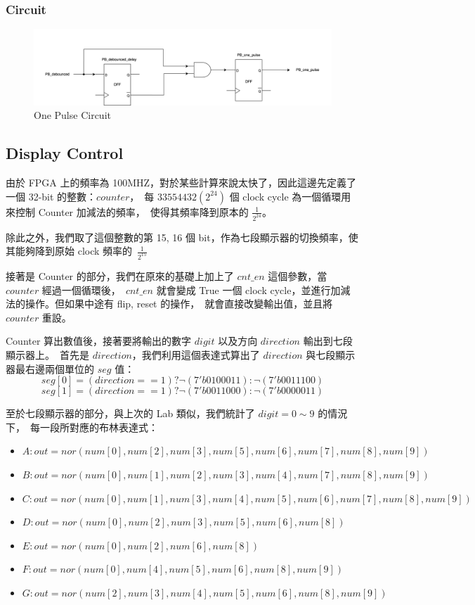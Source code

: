 \documentclass[10.5pt,compsoc,UTF8]{CjC}
\theoremstyle{mystyle}
\begin{document}
\subsubsection*{Circuit}
\begin{figure}[!h]
  \centering
  \includegraphics[width=\textwidth]{./img/Q5-One-pulse.png}
  \caption{One Pulse Circuit}
  \label{fig:one-pulse}
\end{figure}

\newpage

\subsection{Display Control}
由於 FPGA 上的頻率為 100MHZ，對於某些計算來說太快了，因此這邊先定義了一個 32-bit 的整數：$counter$，\
每 $33554432 (2^{24})$ 個 clock cycle 為一個循環用來控制 Counter 加減法的頻率，\
使得其頻率降到原本的 $\frac{1}{2^{24}}$。
\par
除此之外，我們取了這個整數的第 15, 16 個 bit，作為七段顯示器的切換頻率，使其能夠降到原始 clock 頻率的\
$\frac{1}{2^{15}}$
\par
接著是 Counter 的部分，我們在原來的基礎上加上了 $cnt\_en$ 這個參數，當 $counter$ 經過一個循環後，\
$cnt\_en$ 就會變成 True 一個 clock cycle，並進行加減法的操作。但如果中途有 flip, reset 的操作，\
就會直接改變輸出值，並且將 $counter$ 重設。
\par
Counter 算出數值後，接著要將輸出的數字 $digit$ 以及方向 $direction$ 輸出到七段顯示器上。\
首先是 $direction$，我們利用這個表達式算出了 $direction$ 與七段顯示器最右邊兩個單位的 $seg$ 值：
$$seg[0] = (direction == 1) ? \lnot(7'b0100011) : \lnot(7'b0011100)$$
$$seg[1] = (direction == 1) ? \lnot(7'b0011000) : \lnot(7'b0000011)$$

至於七段顯示器的部分，與上次的 Lab 類似，我們統計了 $digit = 0 \sim 9$ 的情況下，\
每一段所對應的布林表達式：
\begin{itemize}
  \item $A: out = nor(num[0], num[2], num[3],
  num[5], num[6], num[7], num[8], num[9])$
  \item $B: out = nor(num[0], num[1], num[2], num[3], num[4],
  num[7], num[8], num[9])$
  \item $C: out = nor(num[0], num[1], num[3], num[4],
  num[5], num[6], num[7], num[8], num[9])$
  \item $D: out = nor(num[0], num[2], num[3], 
  num[5], num[6], num[8])$
  \item $E: out = nor(num[0], num[2],
  num[6], num[8])$
  \item $F: out = nor(num[0], num[4],
        num[5], num[6], num[8], num[9])$
  \item $G: out = nor(num[2], num[3], num[4],
        num[5], num[6], num[8], num[9])$
\end{itemize}
\par
\end{document}
